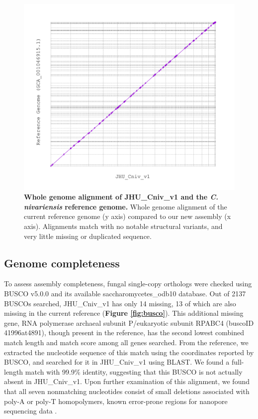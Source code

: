 \begin{figure}[!ht]
\centering
\includegraphics[width = 1\linewidth,keepaspectratio]{figure/mummer.pdf}
\caption[Whole genome alignment of JHU\_Cniv\_v1 and the \textit{C. nivariensis} reference genome]{{\bf Whole genome alignment of JHU\_Cniv\_v1 and the \textit{C. nivariensis} reference genome.} Whole genome alignment of the current reference genome (y axis) compared to our new assembly (x axis). Alignments match with no notable structural variants, and very little missing or duplicated sequence. }
\label{fig:mummer}
\end{figure}


\subsection{Genome completeness}
\label{sec:gencomp}

To assess assembly completeness, fungal single-copy orthologs were checked using BUSCO v5.0.0 \citep{Simao2015-zz} and its available saccharomycetes\_odb10 database. Out of 2137 BUSCOs searched, JHU\_Cniv\_v1 has only 14 missing, 13 of which are also missing in the current reference ({\bf Figure \ref{fig:busco}}). This additional missing gene, RNA polymerase archaeal subunit P/eukaryotic subunit RPABC4 (buscoID 41996at4891), though present in the reference, has the second lowest combined match length and match score among all genes searched. From the reference, we extracted the nucleotide sequence of this match using the coordinates reported by BUSCO, and searched for it in JHU\_Cniv\_v1 using BLAST. We found a full-length match with 99.9\% identity, suggesting that this BUSCO is not actually absent in JHU\_Cniv\_v1. Upon further examination of this alignment, we found that all seven nonmatching nucleotides consist of small deletions associated with poly-A or poly-T homopolymers, known error-prone regions for nanopore sequencing data \citep{Watson2019-tk}.

